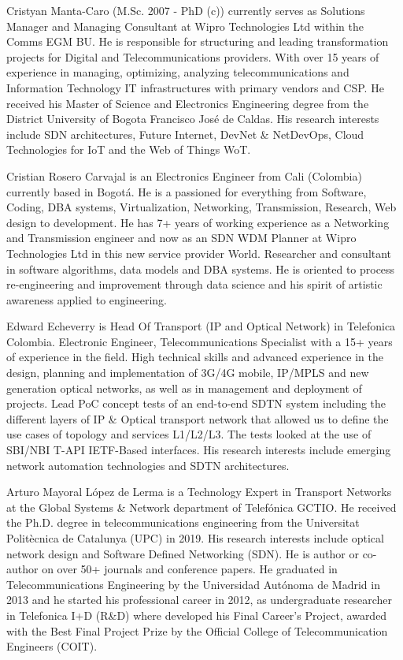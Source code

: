 \documentclass[a4paper,fleqn]{cas-dc}
\begin{document}
Cristyan Manta-Caro (M.Sc. 2007 - PhD (c)) currently serves as Solutions Manager and Managing Consultant at Wipro Technologies Ltd within the Comms EGM BU. He is responsible for structuring and leading transformation projects for Digital and Telecommunications providers. With over 15 years of experience in managing, optimizing, analyzing telecommunications and Information Technology IT infrastructures with primary vendors and CSP. He received his Master of Science and Electronics Engineering degree from the District University of Bogota Francisco Jos\'e de Caldas. His research interests include SDN architectures, Future Internet, DevNet \& NetDevOps, Cloud Technologies for IoT and the Web of Things WoT.
\endbio

Cristian Rosero Carvajal is an Electronics Engineer from Cali (Colombia) currently based in Bogotá. He is a passioned for everything from Software, Coding, DBA systems, Virtualization, Networking, Transmission, Research, Web design to development. He has 7+ years of working experience as a Networking and Transmission engineer and now as an SDN WDM Planner at Wipro Technologies Ltd in this new service provider World. Researcher and consultant in software algorithms, data models and DBA systems. He is oriented to process re-engineering and improvement through data science and his spirit of artistic awareness applied to engineering.
\endbio

Edward Echeverry is Head Of Transport (IP and Optical Network) in Telefonica Colombia. Electronic Engineer, Telecommunications Specialist with a 15+ years of experience in the field. High technical skills and advanced experience in the design, planning and implementation of 3G/4G mobile, IP/MPLS and new generation optical networks, as well as in management and deployment of projects. Lead PoC concept tests of an end-to-end SDTN system including the different layers of IP \& Optical transport network that allowed us to define the use cases of topology and services L1/L2/L3. The tests looked at the use of SBI/NBI T-API IETF-Based interfaces. His research interests include emerging network automation technologies and SDTN architectures.
\endbio

\hfill\break
\hfill\break
\hfill\break
\hfill\break

Arturo Mayoral López de Lerma is a Technology Expert in Transport Networks at the Global Systems \& Network department of Telefónica GCTIO. He received the Ph.D. degree in telecommunications engineering from the Universitat Politècnica de Catalunya (UPC) in 2019. His  research  interests  include  optical network design and Software Defined Networking (SDN). He is author or co-author on over 50+ journals and conference papers.
He graduated in Telecommunications Engineering by the Universidad Autónoma de Madrid in 2013 and he started his professional career in 2012, as undergraduate researcher in Telefonica I+D (R\&D) where developed his Final Career’s Project, awarded with the Best Final Project Prize by the Official College of Telecommunication Engineers (COIT).
\endbio
\end{document}
